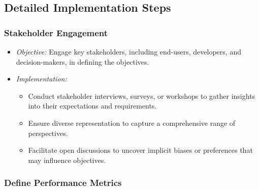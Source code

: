 \documentclass[12pt,a4paper,openright,twoside]{book}
\begin{document}
\subsection{Detailed Implementation Steps}

\subsubsection{Stakeholder Engagement}

\begin{itemize}

    \item \emph{Objective:} Engage key stakeholders, including end-users, developers, and decision-makers, in defining the objectives.

    \item \emph{Implementation:}

        \begin{itemize}
            
            \item Conduct stakeholder interviews, surveys, or workshops to gather insights into their expectations and requirements.
            
            \item Ensure diverse representation to capture a comprehensive range of perspectives.
            
            \item Facilitate open discussions to uncover implicit biases or preferences that may influence objectives.
        
        \end{itemize}

\end{itemize}

\subsubsection{Define Performance Metrics}
\end{document}
